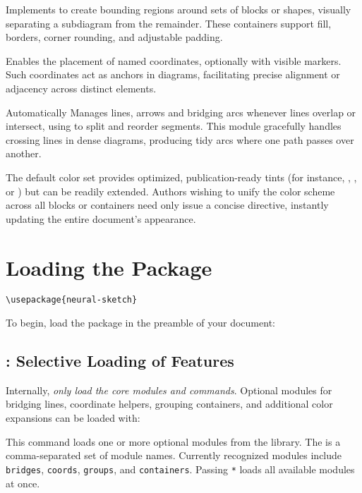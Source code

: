 \documentclass[show-experimental]{l3doc}
\begin{document}
 Implements  to create bounding regions around sets of blocks or shapes, visually separating a subdiagram from the remainder. These containers support fill, borders, corner rounding, and adjustable padding.

 Enables the placement of named coordinates, optionally with visible markers. Such coordinates act as anchors in diagrams, facilitating precise alignment or adjacency across distinct elements.

 Automatically Manages lines, arrows and bridging arcs whenever lines overlap or intersect, using  to split and reorder segments. This module gracefully handles crossing lines in dense diagrams, producing tidy arcs where one path passes over another.


The default color set provides optimized, publication-ready tints (for instance, , , or ) but can be readily extended. Authors wishing to unify the color scheme across all blocks or containers need only issue a concise  directive, instantly updating the entire document’s appearance.

\section{Loading the Package}

\begin{lstlisting}
\usepackage{neural-sketch}
\end{lstlisting}

To begin, load the package in the preamble of your document:


\subsection{: Selective Loading of Features}

Internally,  \textit{only load the core modules and commands}. Optional modules for bridging lines, coordinate helpers, grouping containers, and additional color expansions can be loaded with:

\begin{function}{\nskUseModule}
	\begin{syntax}
		 
	\end{syntax}
	This command loads one or more optional modules from the
	 library. The  is a comma-separated
	set of module names. Currently recognized modules include
	\texttt{bridges}, \texttt{coords}, \texttt{groups}, and
	\texttt{containers}. Passing \verb|*| loads all available modules at once.
\end{function}
\end{document}
